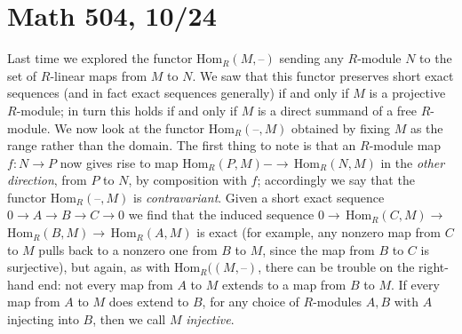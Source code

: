 \documentclass[10pt]{article}
\begin{document}
\section*{Math 504, 10/24}

Last time we explored the functor Hom$_R(M,\text{--})$ sending any
$R$-module $N$ to the set of $R$-linear maps from $M$ to $N$. We saw
that this functor preserves short exact sequences (and in fact exact
sequences generally) if and only if $M$ is a projective $R$-module; in
turn this holds if and only if $M$ is a direct summand of a free
$R$-module. We now look at the functor Hom$_R(\text{--},M)$ obtained by
fixing $M$ as the range rather than the domain. The first thing to note
is that an $R$-module map $f:N\rightarrow P$ now gives rise to map
Hom$_R(P,M)-\rightarrow\,$Hom$_R(N,M)$ in the {\sl other direction},
from $P$ to $N$, by composition with $f$; accordingly we say that the
functor Hom$_R(\text{--},M)$ is {\sl contravariant}. Given a short exact
sequence $0\rightarrow A\rightarrow B\rightarrow C\rightarrow 0$ we find
that the induced sequence
$0\rightarrow\,$Hom$_R(C,M)\rightarrow\,$Hom$_R(B,M)\rightarrow\,$Hom$_R(A,M)$
is exact (for example, any nonzero map from $C$ to $M$ pulls back to a
nonzero one from $B$ to $M$, since the map from $B$ to $C$ is
surjective), but again, as with Hom$_R((M,\text{--})$, there can be
trouble on the right-hand end: not every map from $A$ to $M$ extends to
a map from $B$ to $M$. If every map from $A$ to $M$ does extend to $B$,
for any choice of $R$-modules $A,B$ with $A$ injecting into $B$, then we
call $M$ {\sl injective}.
\end{document}
